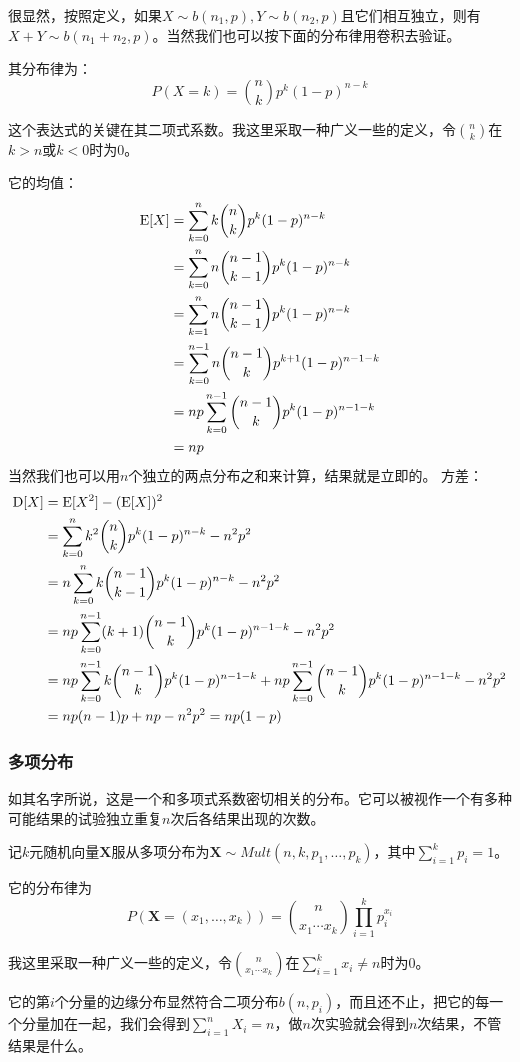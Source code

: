 很显然，按照定义，如果$X\sim b(n_1,p),Y\sim b(n_2,p)$且它们相互独立，则有$X+Y\sim b(n_1+n_2,p)$。当然我们也可以按下面的分布律用卷积去验证。

其分布律为：
\[
P(X=k)=\binom{n}{k}p^k(1-p)^{n-k}
\]

这个表达式的关键在其二项式系数。我这里采取一种广义一些的定义，令$\binom{n}{k}$在$k>n$或$k<0$时为$0$。

它的均值：
\begin{align*}
\operatorname{E}[X]&=\sum_{k=0}^n k\binom{n}{k}p^k(1-p)^{n-k} \\
&=\sum_{k=0}^n n\binom{n-1}{k-1}p^k(1-p)^{n-k} \\
&=\sum_{k=1}^{n} n\binom{n-1}{k-1}p^k(1-p)^{n-k} \\
&=\sum_{k=0}^{n-1} n\binom{n-1}{k}p^{k+1}(1-p)^{n-1-k} \\
&=np\sum_{k=0}^{n-1} \binom{n-1}{k}p^{k}(1-p)^{n-1-k} \\
&= np
\end{align*}
当然我们也可以用$n$个独立的两点分布之和来计算，结果就是立即的。
方差：
\begin{align*}
\operatorname{D}[X]&=\operatorname{E}[X^2]-(\operatorname{E}[X])^2\\
&= \sum_{k=0}^n k^2\binom{n}{k}p^k(1-p)^{n-k} -n^2p^2\\
&= n\sum_{k=0}^n k\binom{n-1}{k-1}p^k(1-p)^{n-k} -n^2p^2\\
&= np\sum_{k=0}^{n-1} (k+1)\binom{n-1}{k}p^k(1-p)^{n-1-k} -n^2p^2\\
&= np\sum_{k=0}^{n-1} k\binom{n-1}{k}p^k(1-p)^{n-1-k} +np\sum_{k=0}^{n-1} \binom{n-1}{k}p^k(1-p)^{n-1-k} -n^2p^2\\
&= np(n-1)p + np -n^2p^2 = np(1-p)
\end{align*}

\subsubsection{多项分布}
如其名字所说，这是一个和多项式系数密切相关的分布。它可以被视作一个有多种可能结果的试验独立重复$n$次后各结果出现的次数。

记$k$元随机向量$\mathbf{X}$服从多项分布为$\mathbf{X}\sim Mult(n,k,p_1,\ldots,p_k)$，其中$\sum_{i=1}^kp_i=1$。

它的分布律为
\[
P(\mathbf{X}=(x_1,\ldots,x_k))=\binom{n}{x_1\cdots x_k}\prod_{i=1}^k p_i^{x_i}
\]

我这里采取一种广义一些的定义，令$\binom{n}{x_1\cdots x_k}$在$\sum_{i=1}^kx_i\neq n$时为$0$。

它的第$i$个分量的边缘分布显然符合二项分布$b(n,p_i)$，而且还不止，把它的每一个分量加在一起，我们会得到$\sum_{i=1}^nX_i=n$，做$n$次实验就会得到$n$次结果，不管结果是什么。

